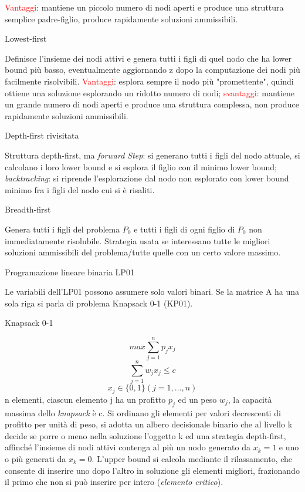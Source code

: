 \documentclass[answers, a4paper, 11pt]{exam}
\begin{document}
\begin{questions}
\begin{solution}
\textcolor{red}{Vantaggi}: mantiene un piccolo numero di nodi aperti e produce una struttura semplice padre-figlio, produce rapidamente soluzioni ammissibili.
\end{solution}
\question Lowest-first
\begin{solution}
Definisce l'insieme dei nodi attivi e genera tutti i figli di quel nodo che ha lower bound più basso, eventualmente aggiornando z dopo la computazione dei nodi più facilmente risolvibili.
\textcolor{red}{Vantaggi}: esplora sempre il nodo più "promettente", quindi ottiene una soluzione esplorando un ridotto numero di nodi; \textcolor{red}{svantaggi}: mantiene un grande numero di nodi aperti e produce una struttura complessa, non produce rapidamente soluzioni ammissibili.
\end{solution}
\question Depth-first rivisitata
\begin{solution}
Struttura depth-first, ma \emph{forward Step}: si generano tutti i figli del nodo attuale, si calcolano i loro lower bound e si esplora il figlio con il minimo lower bound; \emph{backtracking}: si riprende l'esplorazione dal nodo non esplorato con lower bound minimo fra i figli del nodo cui si è risaliti.
\end{solution}
\question Breadth-first
\begin{solution}
Genera tutti i figli del problema $P_{0}$ e tutti i figli di ogni figlio di $P_{0}$ non immediatamente risolubile. Strategia usata se interessano tutte le migliori soluzioni ammissibili del problema/tutte quelle con un certo valore massimo.
\end{solution}
\question Programazione lineare binaria LP01
\begin{solution}
Le variabili dell'LP01 possono assumere solo valori binari. Se la matrice A ha una sola riga si parla di problema Knapsack 0-1 (KP01).
\end{solution}
\question Knapsack 0-1
\begin{solution}
$$max \sum_{j=1}^{n} p_{j}x_{j}$$
$$\sum_{j=1}^{n} w_{j}x_{j} \le c$$
$$x_{j} \in \{0,1\} (j=1,\ldots,n)$$
n elementi, ciascun elemento j ha un profitto $p_{j}$ ed un peso $w_{j}$, la capacità massima dello \emph{knapsack} è c. Si ordinano gli elementi per valori decrescenti di profitto per unità di peso, si adotta un albero decisionale binario che al livello k decide se porre o meno nella soluzione l'oggetto k ed una strategia depth-first, affinché l'insieme di nodi attivi contenga al più un nodo generato da $x_{k} = 1$  e uno o più generati da $x_{k} = 0$. L'upper bound si calcola mediante il rilassamento, che consente di inserire uno dopo l'altro in soluzione gli elementi migliori, frazionando il primo che non si può inserire per intero (\emph{elemento critico}).\\

\end{solution}
\end{questions}
\end{document}
